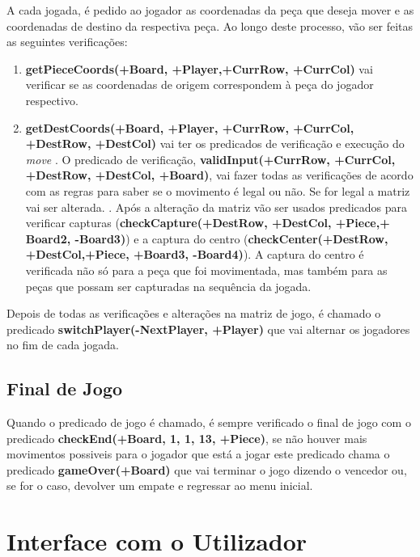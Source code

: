 \documentclass[a4paper]{article}
\begin{document}
\par A cada jogada, é pedido ao jogador as coordenadas da peça que deseja mover e as coordenadas de destino da respectiva peça. Ao longo deste processo, vão ser feitas as seguintes verificações: 
\begin{enumerate}
	\item \textbf{getPieceCoords(+Board, +Player,+CurrRow, +CurrCol)} vai verificar se as coordenadas de origem correspondem à peça do jogador respectivo. 
	\item \textbf{getDestCoords(+Board, +Player, +CurrRow, +CurrCol, +DestRow, +DestCol)} vai ter os predicados de verificação e execução do \textit{move}
	. O predicado de verificação, \textbf{validInput(+CurrRow, +CurrCol, +DestRow, +DestCol, +Board)}, vai fazer todas as verificações de acordo com as regras para saber se o movimento é legal ou não. Se for legal a matriz vai ser alterada. 
	. Após a alteração da matriz vão ser usados predicados para verificar capturas (\textbf{checkCapture(+DestRow, +DestCol, +Piece,+ Board2, -Board3)}) e a captura do centro (\textbf{checkCenter(+DestRow, \linebreak +DestCol,+Piece, +Board3, -Board4)}). A captura do centro é verificada não só para a peça que foi movimentada, mas também para as peças que possam ser capturadas na sequência da jogada. 
\end{enumerate}

Depois de todas as verificações e alterações na matriz de jogo, é chamado o predicado \textbf{switchPlayer(-NextPlayer, +Player)} que vai alternar os jogadores no fim de cada jogada.

\subsection{Final de Jogo}
Quando o predicado de jogo é chamado, é sempre verificado o final de jogo com o predicado \textbf{checkEnd(+Board, 1, 1, 13, +Piece)}, se não houver mais movimentos possiveis para o jogador que está a jogar este predicado chama o predicado \textbf{gameOver(+Board)} que vai terminar o jogo dizendo o vencedor ou, se for o caso, devolver um empate e regressar ao menu inicial.


\section{Interface com o Utilizador}
\end{document}
